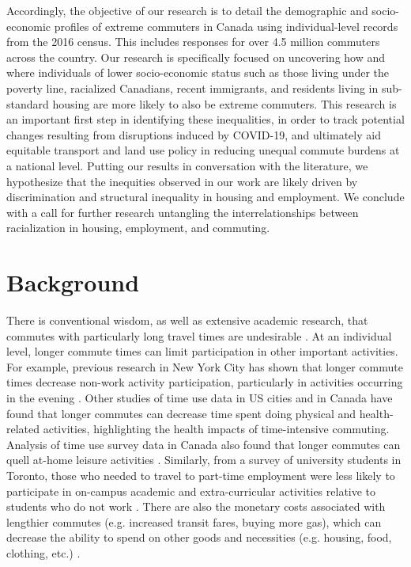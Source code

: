 \documentclass[10 pt,letterpaper]{article}
\begin{document}
Accordingly, the objective of our research is to detail the demographic and socio-economic profiles of extreme commuters in Canada using individual-level records from the 2016 census. This includes responses for over 4.5 million commuters across the country. Our research is specifically focused on uncovering how and where individuals of lower socio-economic status such as those living under the poverty line, racialized Canadians, recent immigrants, and residents living in sub-standard housing are more likely to also be extreme commuters. This research is an important first step in identifying these inequalities, in order to track potential changes resulting from disruptions induced by COVID-19, and ultimately aid equitable transport and land use policy in reducing unequal commute burdens at a national level. Putting our results in conversation with the literature, we hypothesize that the inequities observed in our work are likely driven by discrimination and structural inequality in housing and employment. We conclude with a call for further research untangling the interrelationships between racialization in housing, employment, and commuting.




\section{Background}



There is conventional wisdom, as well as extensive academic research, that commutes with particularly long travel times are undesirable \cite{marion_comparison_2007,maoh_determinants_2012-1,vincent-geslin_determinants_2016,bai_exploring_2020}. At an individual level, longer commute times can limit participation in other important activities. For example, previous research in New York City has shown that longer commute times decrease non-work activity participation, particularly in activities occurring in the evening \cite{chu_modeling_2005}. Other studies of time use data in US cities \cite{christian_trade-offs_2012} and in Canada \cite{hilbrecht_highway_2014} have found that longer commutes can decrease time spent doing physical and health-related activities, highlighting the health impacts of time-intensive commuting. Analysis of time use survey data in Canada also found that longer commutes can quell at-home leisure activities \cite{farber_running_2011, hilbrecht_highway_2014}. Similarly, from a survey of university students in Toronto, those who needed to travel to part-time employment were less likely to participate in on-campus academic and extra-curricular activities relative to students who do not work \cite{allen_how_2018}. There are also the monetary costs associated with lengthier commutes (e.g. increased transit fares, buying more gas), which can decrease the ability to spend on other goods and necessities (e.g. housing, food, clothing, etc.) \cite{lyons_human_2008}.
\end{document}
